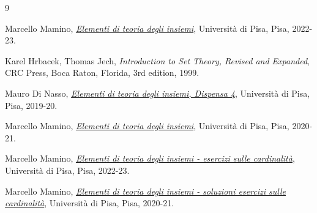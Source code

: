 \pagebreak
\begin{thebibliography}{9}

	Marcello Mamino,
	\href{https://ciovil.li/eti22/}{\textit{Elementi di teoria degli insiemi}},
	Università di Pisa, Pisa,
	2022-23.

	Karel Hrbacek, Thomas Jech,
	\textit{Introduction to Set Theory, Revised and Expanded},
	CRC Press, Boca Raton, Florida,
	3rd edition,
	1999.

	Mauro Di Nasso,
	\href{https://people.dm.unipi.it/dinasso/ETI/dispensa-04ss.pdf}{\textit{Elementi di teoria degli insiemi, Dispensa 4}},
	Università di Pisa, Pisa,
	2019-20.

	Marcello Mamino,
	\href{https://ciovil.li/eti20/}{\textit{Elementi di teoria degli insiemi}},
	Università di Pisa, Pisa,
	2020-21.

	Marcello Mamino,
	\href{https://ciovil.li/eti21/es-cardinalita.pdf}{\textit{Elementi di teoria degli insiemi - esercizi sulle cardinalità}},
	Università di Pisa, Pisa,
	2022-23.

	Marcello Mamino,
	\href{https://ciovil.li/eti20/sol01.pdf}{\textit{Elementi di teoria degli insiemi - soluzioni esercizi sulle cardinalità}},
	Università di Pisa, Pisa,
	2020-21.

\end{thebibliography}

